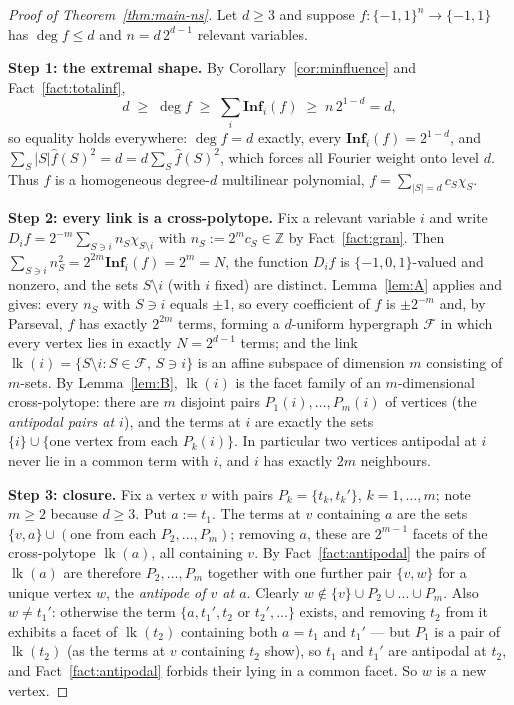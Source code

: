 \documentclass[11pt,reqno]{amsart}
\theoremstyle{plain}
\theoremstyle{definition}
\numberwithin{theorem}{section}
\newcommand{\cube}{\{-1,1\}}
\newcommand{\bits}{\{-1,0,1\}}
\newcommand{\Inf}{\mathbf{Inf}}
\newcommand{\lk}{\operatorname{lk}}
\newcommand{\bbZ}{\mathbb{Z}}
\newcommand{\Fhat}[1]{\widehat{#1}}
\DeclareMathOperator{\Deg}{deg}
\begin{document}
\begin{proof}[Proof of Theorem~\ref{thm:main-ns}]
Let $d \ge 3$ and suppose $f \colon \cube^n \to \cube$ has $\Deg f \le d$ and
$n = d\,2^{d-1}$ relevant variables.

\smallskip\noindent\textbf{Step 1: the extremal shape.}
By Corollary~\ref{cor:minfluence} and Fact~\ref{fact:totalinf},
\[
  d \;\ge\; \Deg f \;\ge\; \sum_{i} \Inf_i(f) \;\ge\; n\,2^{1-d} = d,
\]
so equality holds everywhere: $\Deg f = d$ exactly, every $\Inf_i(f) = 2^{1-d}$, and
$\sum_S |S|\Fhat{f}(S)^2 = d = d\sum_S \Fhat{f}(S)^2$, which forces all Fourier weight onto
level $d$. Thus $f$ is a homogeneous degree-$d$ multilinear polynomial,
$f = \sum_{|S| = d} c_S \chi_S$.

\smallskip\noindent\textbf{Step 2: every link is a cross-polytope.}
Fix a relevant variable $i$ and write $D_i f = 2^{-m}\sum_{S \ni i} n_S \chi_{S \setminus i}$
with $n_S := 2^m c_S \in \bbZ$ by Fact~\ref{fact:gran}. Then
$\sum_{S \ni i} n_S^2 = 2^{2m}\Inf_i(f) = 2^m = N$, the function $D_i f$ is $\bits$-valued and
nonzero, and the sets $S \setminus i$ (with $i$ fixed) are distinct. Lemma~\ref{lem:A} applies
and gives: every $n_S$ with $S \ni i$ equals $\pm 1$, so every coefficient of $f$ is
$\pm 2^{-m}$ and, by Parseval, $f$ has exactly $2^{2m}$ terms, forming a $d$-uniform hypergraph
$\mathcal{F}$ in which every vertex lies in exactly $N = 2^{d-1}$ terms; and the link
$\lk(i) = \{S \setminus i : S \in \mathcal{F},\, S \ni i\}$ is an affine subspace of dimension
$m$ consisting of $m$-sets. By Lemma~\ref{lem:B}, $\lk(i)$ is the facet family of an
$m$-dimensional cross-polytope: there are $m$ disjoint pairs
$P_1(i), \dots, P_m(i)$ of vertices (the \emph{antipodal pairs at $i$}), and the terms at $i$
are exactly the sets $\{i\} \cup \{ \text{one vertex from each } P_k(i)\}$. In particular two
vertices antipodal at $i$ never lie in a common term with $i$, and $i$ has exactly $2m$
neighbours.

\smallskip\noindent\textbf{Step 3: closure.}
Fix a vertex $v$ with pairs $P_k = \{t_k, t_k'\}$, $k = 1, \dots, m$; note $m \ge 2$ because
$d \ge 3$. Put $a := t_1$. The terms at $v$ containing $a$ are the sets
$\{v,a\} \cup (\text{one from each } P_2, \dots, P_m)$; removing $a$, these are $2^{m-1}$ facets
of the cross-polytope $\lk(a)$, all containing $v$. By Fact~\ref{fact:antipodal} the pairs of
$\lk(a)$ are therefore $P_2, \dots, P_m$ together with one further pair $\{v, w\}$ for a unique
vertex $w$, the \emph{antipode of $v$ at $a$}. Clearly
$w \notin \{v\} \cup P_2 \cup \dots \cup P_m$. Also $w \ne t_1'$: otherwise the term
$\{a, t_1', t_2 \text{ or } t_2', \dots\}$ exists, and removing $t_2$ from it exhibits a facet
of $\lk(t_2)$ containing both $a = t_1$ and $t_1'$ --- but $P_1$ is a pair of $\lk(t_2)$ (as the
terms at $v$ containing $t_2$ show), so $t_1$ and $t_1'$ are antipodal at $t_2$, and
Fact~\ref{fact:antipodal} forbids their lying in a common facet. So $w$ is a new vertex.


\end{proof}
\end{document}

